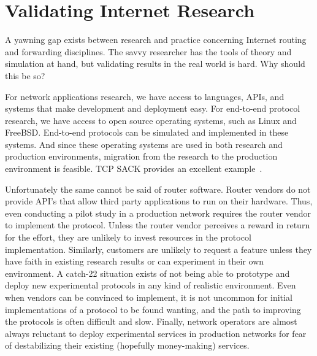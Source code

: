 
\section{Validating Internet Research}

A yawning gap exists between research and practice concerning Internet
routing and forwarding disciplines.  The savvy researcher has the
tools of theory and simulation at hand, but 
validating results in the
real world is hard.  
Why should this be so?



For network applications research, we have access to languages, APIs,
and systems that make development and deployment easy.  For end-to-end
protocol research, we have access to open source operating systems,
such as 
Linux and FreeBSD.  End-to-end protocols can be simulated and
implemented in these systems.  And since these operating systems are
used in both research and production environments, migration from the
research to the production environment is feasible.  TCP
SACK provides an excellent example~\cite{sack}.

Unfortunately the same cannot be said of router software.  Router
vendors do not provide API's that allow third party applications to
run on their hardware.  Thus, even conducting a pilot study in a
production network requires the router vendor to implement the
protocol.  Unless the router vendor perceives a reward in return
for the effort, they are unlikely to invest resources in the protocol
implementation.  Similarly, customers are unlikely to request a
feature unless they have faith in existing research results or can
experiment in their own environment.  A catch-22 
situation exists of not being able to prototype and deploy new
experimental protocols in any kind of realistic environment.  Even
when vendors can be convinced to implement, it is not uncommon for
initial implementations of a protocol to be found wanting, and the
path to improving the protocols is often difficult and slow.  Finally,
network operators are almost always reluctant to deploy experimental
services in production networks for fear of destabilizing their
existing (hopefully money-making) services.

